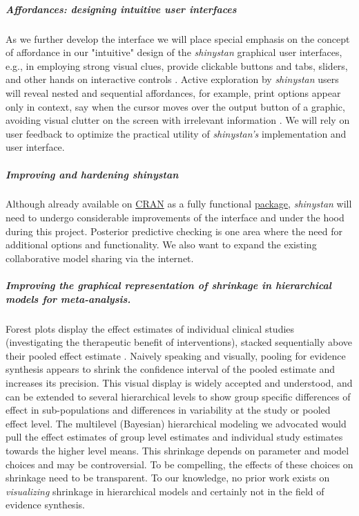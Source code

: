 \documentclass[11pt,notitlepage]{article}
\begin{document}
\subparagraph*{Affordances: designing intuitive user interfaces}
As we further develop the interface we will place special emphasis on the concept of affordance in our "intuitive" 
design of the \textit{shinystan} graphical user interfaces, e.g., in employing strong visual clues, provide clickable buttons and tabs, sliders, and other 
hands on interactive controls \cite{NormanAffordances1999}. Active exploration by \textit{shinystan} users will reveal nested and sequential 
affordances, for example, print options appear only in context, say when the cursor moves over the output button of a graphic, 
avoiding visual clutter on the screen with irrelevant information \cite{Mcgrenere2000affordances}. We will rely on user 
feedback to optimize the practical utility of \textit{shinystan's} implementation and user interface.

\subparagraph*{Improving and hardening \textit{shinystan}}
Although already available on \href{https://cran.r-project.org/web/packages/shinystan/index.html}{CRAN} 
as a fully functional \href{https://www.youtube.com/watch?v=X31xqNHcvQs}{package},
\textit{shinystan} will need to undergo considerable improvements of the interface and under the hood during this project. Posterior predictive 
checking is one area where the need for additional options and functionality. We also want to expand the existing collaborative 
model sharing via the internet. 

\subparagraph{Improving the graphical representation of shrinkage in hierarchical models for meta-analysis.} Forest plots display the effect estimates of individual clinical studies (investigating the therapeutic benefit of interventions), stacked sequentially above their pooled effect estimate \cite{Lewis2001forestplot}. Naively speaking and visually, pooling for evidence synthesis appears to shrink the confidence interval of the pooled estimate and increases its precision. This visual display is widely accepted and understood, and can be extended to several hierarchical levels to show group specific differences of effect in sub-populations and differences in variability at the study or pooled effect level. The multilevel (Bayesian) hierarchical modeling we advocated \cite{AndreaeJohnsonAbstract2013} would pull the effect estimates of group level estimates and individual study estimates towards the higher level means. This shrinkage depends on parameter and model choices and may be controversial. To be compelling, the effects of these choices on shrinkage need to be transparent. To our knowledge, no prior work exists on \textit{visualizing} shrinkage in hierarchical models and certainly not in the field of evidence synthesis.
\end{document}
